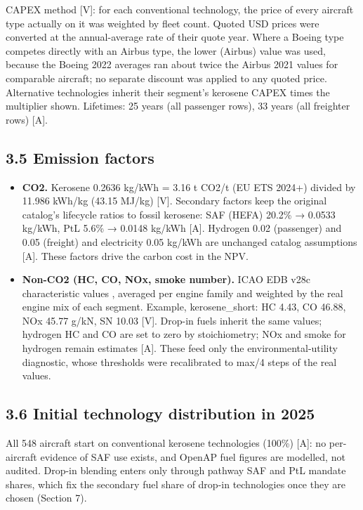 \documentclass[11pt,a4paper]{article}
\begin{document}
CAPEX method [V]: for each conventional technology, the price of every aircraft type actually on it was weighted by fleet count. Quoted USD prices were converted at the annual-average rate of their quote year. Where a Boeing type competes directly with an Airbus type, the lower (Airbus) value was used, because the Boeing 2022 averages ran about twice the Airbus 2021 values for comparable aircraft; no separate discount was applied to any quoted price. Alternative technologies inherit their segment's kerosene CAPEX times the multiplier shown. Lifetimes: 25 years (all passenger rows), 33 years (all freighter rows) [A].

\subsection*{3.5 Emission factors}

\begin{itemize}
\item{} \textbf{CO2.} Kerosene 0.2636 kg/kWh = 3.16 t CO2/t (EU ETS 2024+) divided by 11.986 kWh/kg (43.15 MJ/kg) [V]. Secondary factors keep the original catalog's lifecycle ratios to fossil kerosene: SAF (HEFA) 20.2\% → 0.0533 kg/kWh, PtL 5.6\% → 0.0148 kg/kWh [A]. Hydrogen 0.02 (passenger) and 0.05 (freight) and electricity 0.05 kg/kWh are unchanged catalog assumptions [A]. These factors drive the carbon cost in the NPV.
\item{} \textbf{Non-CO2 (HC, CO, NOx, smoke number).} ICAO EDB v28c characteristic values \citep{easa}, averaged per engine family and weighted by the real engine mix of each segment. Example, kerosene\_short: HC 4.43, CO 46.88, NOx 45.77 g/kN, SN 10.03 [V]. Drop-in fuels inherit the same values; hydrogen HC and CO are set to zero by stoichiometry; NOx and smoke for hydrogen remain estimates [A]. These feed only the environmental-utility diagnostic, whose thresholds were recalibrated to max/4 steps of the real values.
\end{itemize}

\subsection*{3.6 Initial technology distribution in 2025}

All 548 aircraft start on conventional kerosene technologies (100\%) [A]: no per-aircraft evidence of SAF use exists, and OpenAP fuel figures are modelled, not audited. Drop-in blending enters only through pathway SAF and PtL mandate shares, which fix the secondary fuel share of drop-in technologies once they are chosen (Section 7).
\end{document}
